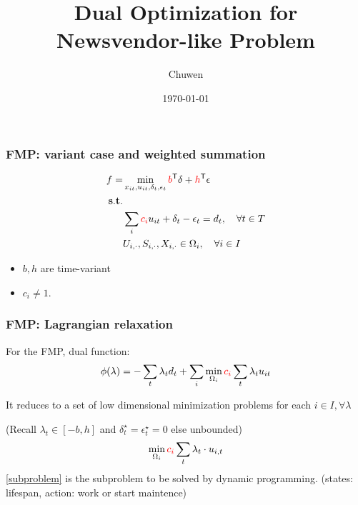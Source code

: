 
\usepackage{subfig}
\title{Dual Optimization for Newsvendor-like Problem}
\author{Chuwen}
\date{\today}


\frame{\titlepage}



\begin{frame}
  \frametitle{FMP: variant case and weighted summation}
  \begin{align}
    \label{eq:fmp.obj}  f = & \min_{x_{it}, u_{it}, \delta_t, \epsilon_t}
    \textcolor{red}{b}^\mathsf{T}  \delta + \textcolor{red}{h}^\mathsf{T}\epsilon                                   \\
    \nonumber \mathbf{s.t.} &                                                                                       \\
    \label{eq:fmp.demand}   & \sum_i \textcolor{red}{c_i} u_{it} + \delta_t - \epsilon_t = d_t,\quad\forall t \in T \\
                            & U_{i, \cdot}, S_{i, \cdot}, X_{i, \cdot} \in \Omega_i,\quad \forall i\in I
  \end{align}
  \begin{itemize}
    \item \(b, h\) are time-variant
    \item \(c_i \neq 1\).
  \end{itemize}
\end{frame}


\begin{frame}
  \frametitle{FMP: Lagrangian relaxation}
  For the FMP, dual function:
  \[\begin{aligned}
      \phi(\lambda) & = - \sum_t \lambda_t d_t + \sum_i  \min_{\Omega_i} \textcolor{red}{c_i} \sum_t \lambda_t u_{it} \\
    \end{aligned}\]

  It reduces to a set of low dimensional minimization problems for each \(i \in I, \forall \lambda\)

  (Recall \(\lambda_t \in [-b, h] \) and \(\delta_t^\star = \epsilon_t^\star = 0\) else unbounded)
  \begin{equation}\label{subproblem}\begin{aligned}
      \min_{\Omega_i} \textcolor{red}{c_i} \sum_t \lambda_t \cdot u_{i,t}
    \end{aligned}\end{equation}
  \eqref{subproblem} is the subproblem to be solved by dynamic programming. (states: lifespan, action: work or start maintence)
\end{frame}

